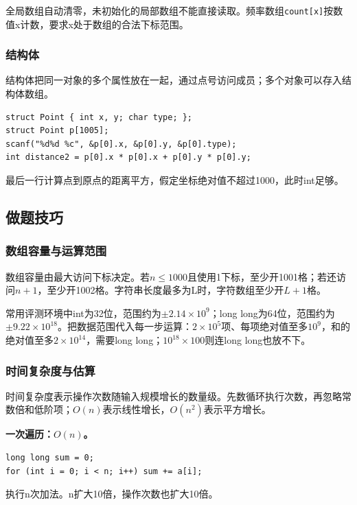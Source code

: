 \documentclass[UTF8,11pt,a4paper,fontset=none]{ctexart}
\begin{document}
全局数组自动清零，未初始化的局部数组不能直接读取。频率数组\texttt{count[x]}按数值x计数，要求x处于数组的合法下标范围。
\subsubsection{结构体}
结构体把同一对象的多个属性放在一起，通过点号访问成员；多个对象可以存入结构体数组。
\par\noindent\begin{minipage}{\linewidth}
\begin{lstlisting}
struct Point { int x, y; char type; };
struct Point p[1005];
scanf("%d%d %c", &p[0].x, &p[0].y, &p[0].type);
int distance2 = p[0].x * p[0].x + p[0].y * p[0].y;
\end{lstlisting}
\end{minipage}\par
最后一行计算点到原点的距离平方，假定坐标绝对值不超过1000，此时int足够。
\subsection{做题技巧}
\subsubsection{数组容量与运算范围}
数组容量由最大访问下标决定。若$n\le1000$且使用1下标，至少开1001格；若还访问$n+1$，至少开1002格。字符串长度最多为L时，字符数组至少开$L+1$格。

常用评测环境中int为32位，范围约为$\pm2.14\times10^9$；long long为64位，范围约为$\pm9.22\times10^{18}$。把数据范围代入每一步运算：$2\times10^5$项、每项绝对值至多$10^9$，和的绝对值至多$2\times10^{14}$，需要long long；$10^{18}\times100$则连long long也放不下。
\subsubsection{时间复杂度与估算}
时间复杂度表示操作次数随输入规模增长的数量级。先数循环执行次数，再忽略常数倍和低阶项；$O(n)$表示线性增长，$O(n^2)$表示平方增长。

\textbf{一次遍历：$O(n)$。}
\par\noindent\begin{minipage}{\linewidth}
\begin{lstlisting}
long long sum = 0;
for (int i = 0; i < n; i++) sum += a[i];
\end{lstlisting}
\end{minipage}\par
执行n次加法。n扩大10倍，操作次数也扩大10倍。
\end{document}
